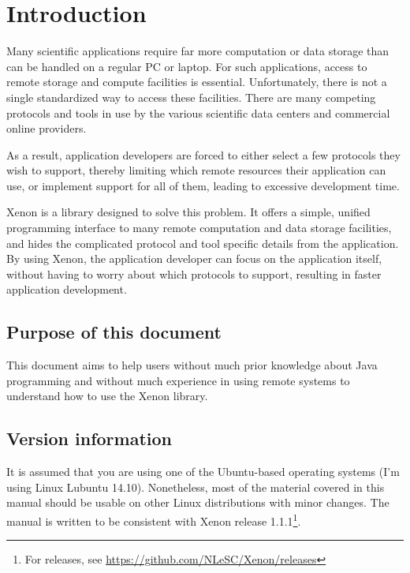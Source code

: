 \chapter{Introduction}

Many scientific applications require far more computation or data storage than can be handled on a regular PC or laptop. For such applications, access to remote storage and compute facilities is essential. Unfortunately, there is not a single standardized way to access these facilities. There are many competing protocols and tools in use by the various scientific data centers and commercial online providers.

As a result, application developers are forced to either select a few protocols they wish to support, thereby limiting which remote resources their application can use, or implement support for all of them, leading to excessive development time.

Xenon is a library designed to solve this problem. It offers a simple, unified programming interface to many remote computation and data storage facilities, and hides the complicated protocol and tool specific details from the application. By using Xenon, the application developer can focus on the application itself, without having to worry about which protocols to support, resulting in faster application development.


\section{Purpose of this document}

This document aims to help users without much prior knowledge about Java programming and without much experience in using remote systems to understand how to use the Xenon library.

\section{Version information}

It is assumed that you are using one of the Ubuntu-based operating systems (I'm using Linux Lubuntu 14.10). Nonetheless, most of the material covered in this manual should be usable on other Linux distributions with minor changes. The manual is written to be consistent with Xenon release 1.1.1\footnote{For releases, see \url{https://github.com/NLeSC/Xenon/releases}}.


